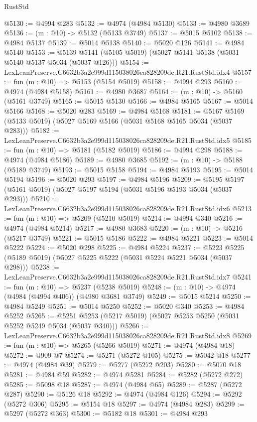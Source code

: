 \begin{lexlean}{RustStd}
\begin{coremodule}
@5130 := @4994 @283
@5132 := @4974 (@4984 @5130)
@5133 := @4980 @3689
@5136 := (m : @10) -> @5132 (@5133 @3749)
@5137 := @5015 @5102
@5138 := @4984 @5137
@5139 := @5014 @5138
@5140 := @5020 @126
@5141 := @4984 @5140
@5153 := @5139 @5141 (@5105 @5019) (@5027 @5141 @5138 (@5031 @5140 @5137 @5034 (@5037 @126)))
@5154 := LexLeanPreserve.C6632b3a2e999d115038026ca828209de.R21.RustStd.idx4
@5157 := fun (m : @10) => @5153 (@5154 @5019)
@5158 := @4994 @293
@5160 := @4974 (@4984 @5158)
@5161 := @4980 @3687
@5164 := (m : @10) -> @5160 (@5161 @3749)
@5165 := @5015 @5130
@5166 := @4984 @5165
@5167 := @5014 @5166
@5168 := @5020 @283
@5169 := @4984 @5168
@5181 := @5167 @5169 (@5133 @5019) (@5027 @5169 @5166 (@5031 @5168 @5165 @5034 (@5037 @283)))
@5182 := LexLeanPreserve.C6632b3a2e999d115038026ca828209de.R21.RustStd.idx5
@5185 := fun (m : @10) => @5181 (@5182 @5019)
@5186 := @4994 @298
@5188 := @4974 (@4984 @5186)
@5189 := @4980 @3685
@5192 := (m : @10) -> @5188 (@5189 @3749)
@5193 := @5015 @5158
@5194 := @4984 @5193
@5195 := @5014 @5194
@5196 := @5020 @293
@5197 := @4984 @5196
@5209 := @5195 @5197 (@5161 @5019) (@5027 @5197 @5194 (@5031 @5196 @5193 @5034 (@5037 @293)))
@5210 := LexLeanPreserve.C6632b3a2e999d115038026ca828209de.R21.RustStd.idx6
@5213 := fun (m : @10) => @5209 (@5210 @5019)
@5214 := @4994 @340
@5216 := @4974 (@4984 @5214)
@5217 := @4980 @3683
@5220 := (m : @10) -> @5216 (@5217 @3749)
@5221 := @5015 @5186
@5222 := @4984 @5221
@5223 := @5014 @5222
@5224 := @5020 @298
@5225 := @4984 @5224
@5237 := @5223 @5225 (@5189 @5019) (@5027 @5225 @5222 (@5031 @5224 @5221 @5034 (@5037 @298)))
@5238 := LexLeanPreserve.C6632b3a2e999d115038026ca828209de.R21.RustStd.idx7
@5241 := fun (m : @10) => @5237 (@5238 @5019)
@5248 := (m : @10) -> @4974 (@4984 (@4994 @406)) (@4980 @3681 @3749)
@5249 := @5015 @5214
@5250 := @4984 @5249
@5251 := @5014 @5250
@5252 := @5020 @340
@5253 := @4984 @5252
@5265 := @5251 @5253 (@5217 @5019) (@5027 @5253 @5250 (@5031 @5252 @5249 @5034 (@5037 @340)))
@5266 := LexLeanPreserve.C6632b3a2e999d115038026ca828209de.R21.RustStd.idx8
@5269 := fun (m : @10) => @5265 (@5266 @5019)
@5271 := @4974 (@4984 @18)
@5272 := @909 @7
@5274 := @5271 (@5272 @105)
@5275 := @5042 @18
@5277 := @4974 (@4984 @39)
@5279 := @5277 (@5272 @203)
@5280 := @5070 @18
@5281 := @4984 @59
@5282 := @4974 @5281
@5284 := @5282 (@5272 @272)
@5285 := @5098 @18
@5287 := @4974 (@4984 @65)
@5289 := @5287 (@5272 @287)
@5290 := @5126 @18
@5292 := @4974 (@4984 @126)
@5294 := @5292 (@5272 @306)
@5295 := @5154 @18
@5297 := @4974 (@4984 @283)
@5299 := @5297 (@5272 @363)
@5300 := @5182 @18
@5301 := @4984 @293

\end{coremodule}
\end{lexlean}
